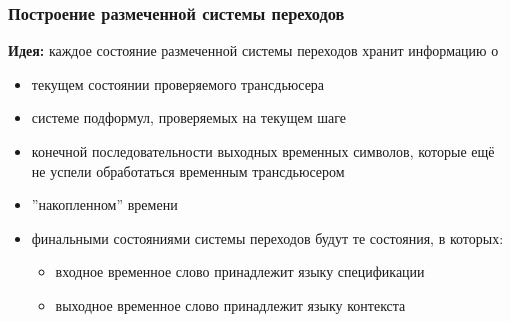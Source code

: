 \documentclass{beamer}
\begin{document}
\begin{frame}
\frametitle{Построение размеченной системы переходов}

\textbf{Идея:} каждое состояние размеченной системы переходов хранит информацию о
\begin{itemize}
	\item текущем состоянии проверяемого трансдьюсера
	\item системе подформул, проверяемых на текущем шаге
	\item конечной последовательности выходных временных символов, которые ещё не успели обработаться временным трансдьюсером
	\item ''накопленном'' времени
	\item финальными состояниями системы переходов будут те состояния, в которых:
    \begin{itemize}
        \item входное временное слово принадлежит языку спецификации
        \item выходное временное слово принадлежит языку контекста
    \end{itemize}
\end{itemize}

\end{frame}






\end{document}
